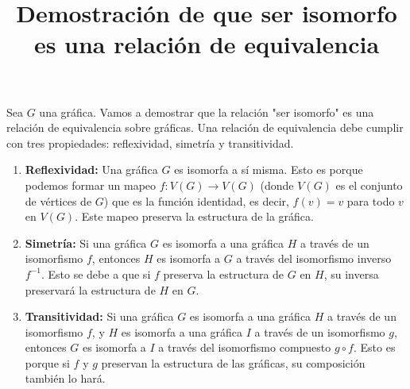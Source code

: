 \documentclass{article}
\begin{document}
\title{Demostración de que ser isomorfo es una relación de equivalencia}
\maketitle

Sea $G$ una gráfica. Vamos a demostrar que la relación "ser isomorfo" es una relación de equivalencia sobre gráficas. Una relación de equivalencia debe cumplir con tres propiedades: reflexividad, simetría y transitividad.

\begin{enumerate}
    \item \textbf{Reflexividad:} Una gráfica $G$ es isomorfa a sí misma. Esto es porque podemos formar un mapeo $f: V(G) \to V(G)$ (donde $V(G)$ es el conjunto de vértices de $G$) que es la función identidad, es decir, $f(v) = v$ para todo $v$ en $V(G)$. Este mapeo preserva la estructura de la gráfica.
    
    \item \textbf{Simetría:} Si una gráfica $G$ es isomorfa a una gráfica $H$ a través de un isomorfismo $f$, entonces $H$ es isomorfa a $G$ a través del isomorfismo inverso $f^{-1}$. Esto se debe a que si $f$ preserva la estructura de $G$ en $H$, su inversa preservará la estructura de $H$ en $G$.
    
    \item \textbf{Transitividad:} Si una gráfica $G$ es isomorfa a una gráfica $H$ a través de un isomorfismo $f$, y $H$ es isomorfa a una gráfica $I$ a través de un isomorfismo $g$, entonces $G$ es isomorfa a $I$ a través del isomorfismo compuesto $g \circ f$. Esto es porque si $f$ y $g$ preservan la estructura de las gráficas, su composición también lo hará.
\end{enumerate}
\end{document}
